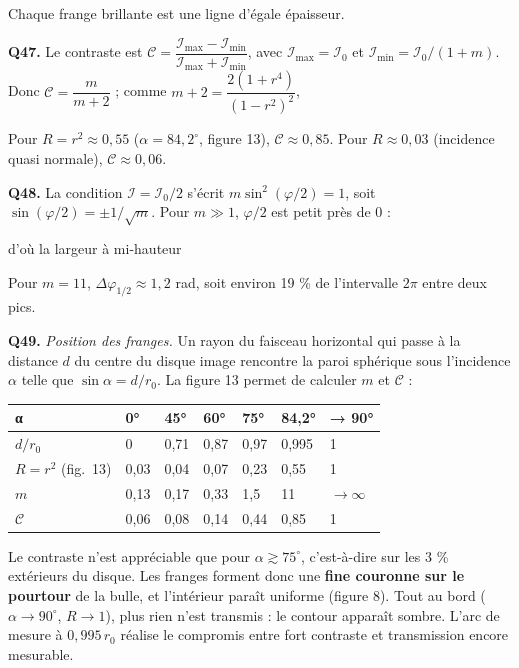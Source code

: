 \documentclass[11pt,a4paper]{article}
\newcommand{\equationajustee}[1]{%
  \sbox{\boiteequation}{$\displaystyle #1$}%
  \ifdim\wd\boiteequation>\linewidth
    \[\resizebox{\linewidth}{!}{\usebox{\boiteequation}}\]%
  \else
    \[#1\]%
  \fi}
\begin{document}
Chaque frange brillante est une ligne d'égale épaisseur.

\textbf{Q47.} Le contraste est \(\mathcal C=\dfrac{\mathcal I_{\text{max}}-\mathcal I_{\text{min}}}{\mathcal I_{\text{max}}+\mathcal I_{\text{min}}}\), avec \(\mathcal I_{\text{max}}=\mathcal I_0\) et \(\mathcal I_{\text{min}}=\mathcal I_0/(1+m)\). Donc \(\mathcal C=\dfrac m{m+2}\) ; comme \(m+2=\dfrac{2(1+r^4)}{(1-r^2)^2}\),

\equationajustee{\boxed{\mathcal C=\frac{2r^2}{1+r^4}}}

Pour \(R=r^2\approx0{,}55\) (\(\alpha=84{,}2^\circ\), figure 13), \(\mathcal C\approx0{,}85\). Pour \(R\approx0{,}03\) (incidence quasi normale), \(\mathcal C\approx0{,}06\).

\textbf{Q48.} La condition \(\mathcal I=\mathcal I_0/2\) s'écrit \(m\sin^2(\varphi/2)=1\), soit \(\sin(\varphi/2)=\pm1/\sqrt m\). Pour \(m\gg1\), \(\varphi/2\) est petit près de 0 :

\equationajustee{\boxed{\varphi_\pm\approx\pm\frac2{\sqrt m}}}

d'où la largeur à mi-hauteur

\equationajustee{\boxed{\Delta\varphi_{1/2}\approx\frac4{\sqrt m}}}

Pour \(m=11\), \(\Delta\varphi_{1/2}\approx1{,}2\) rad, soit environ 19 \% de l'intervalle \(2\pi\) entre deux pics.

\textbf{Q49.} \emph{Position des franges.} Un rayon du faisceau horizontal qui passe à la distance \(d\) du centre du disque image rencontre la paroi sphérique sous l'incidence \(\alpha\) telle que \(\sin\alpha=d/r_0\). La figure 13 permet de calculer \(m\) et \(\mathcal C\) :

\begin{longtable}[]{@{}lllllll@{}}
\toprule\noalign{}
α & 0° & 45° & 60° & 75° & 84,2° & → 90° \\
\midrule\noalign{}
\endhead
\bottomrule\noalign{}
\endlastfoot
\(d/r_0\) & 0 & 0,71 & 0,87 & 0,97 & 0,995 & 1 \\
\(R=r^2\) (fig.~13) & 0,03 & 0,04 & 0,07 & 0,23 & 0,55 & 1 \\
\(m\) & 0,13 & 0,17 & 0,33 & 1,5 & 11 & \(\to\infty\) \\
\(\mathcal C\) & 0,06 & 0,08 & 0,14 & 0,44 & 0,85 & 1 \\
\end{longtable}

Le contraste n'est appréciable que pour \(\alpha\gtrsim75^\circ\), c'est-à-dire sur les 3 \% extérieurs du disque. Les franges forment donc une \textbf{fine couronne sur le pourtour} de la bulle, et l'intérieur paraît uniforme (figure 8). Tout au bord (\(\alpha\to90^\circ\), \(R\to1\)), plus rien n'est transmis : le contour apparaît sombre. L'arc de mesure à \(0{,}995\,r_0\) réalise le compromis entre fort contraste et transmission encore mesurable.
\end{document}

